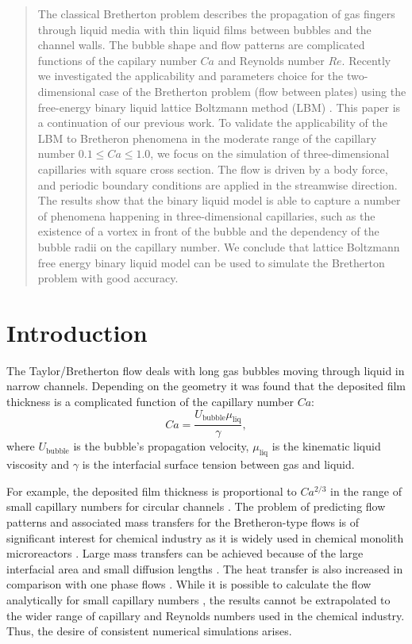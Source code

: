 \documentclass{article}
\begin{document}
\begin{abstract}
The classical Bretherton problem describes the propagation of gas fingers through liquid media with
thin liquid films between bubbles and the channel walls. The bubble shape and flow patterns are
complicated functions of the capilary number $Ca$ and Reynolds number $Re$. Recently we investigated
the applicability and parameters choice for the two-dimensional case of the Bretherton problem (flow
between plates) using the free-energy binary liquid lattice Boltzmann method (LBM)
\cite{kuzmin-binary2d}. This paper is a continuation of our previous work.  To validate the applicability
of the LBM to Bretheron phenomena in the moderate range of the capillary number $0.1\leq Ca \leq 1.0$,
we focus on the simulation of three-dimensional capillaries with square cross section.
The flow is driven by a body force, and
periodic boundary conditions are applied in the streamwise direction. The results show that the
binary liquid model is able to capture a number of phenomena happening in three-dimensional
capillaries, such as the existence of a vortex in front of the bubble and the dependency
of the bubble radii on the capillary number.  We conclude that lattice Boltzmann free energy binary
liquid model can be used to simulate the Bretherton problem with good accuracy. 
\end{abstract}

\section{Introduction}
The Taylor/Bretherton \cite{bretherton} flow deals with long gas bubbles moving through liquid in
narrow channels. Depending on the geometry it was found that the deposited film thickness
is a complicated function of the capillary number $Ca$:
\begin{equation}
\label{capillary:number:definition}
Ca=\frac{U_{\mathrm{bubble}} \mu_{\mathrm{liq}}}{\gamma},
\end{equation}
where $U_{\mathrm{bubble}}$ is the bubble's propagation velocity, $\mu_{\mathrm{liq}}$ is the
kinematic liquid viscosity and $\gamma$ is the interfacial surface tension between gas and liquid. 

For example, the deposited film thickness
is proportional to $Ca^{2/3}$ in the range of small capillary numbers for circular channels
\cite{bretherton,heil-bretherton}. 
The problem of predicting flow patterns and associated mass transfers for the Bretheron-type flows
is of significant interest for chemical industry as it is widely used in chemical monolith
microreactors \cite{kreutzer-pressure-drop}. Large mass transfers can be achieved because of the
large interfacial area and small diffusion lengths \cite{cerro-bubble-train}. The heat transfer is
also increased in comparison with one phase flows \cite{fukugata-levelset}. While it
is possible to calculate the flow analytically for small capillary numbers \cite{bretherton}, the
results cannot be extrapolated to the wider range of capillary and Reynolds numbers used in the
chemical industry.  Thus, the desire of consistent numerical simulations arises.
\end{document}
